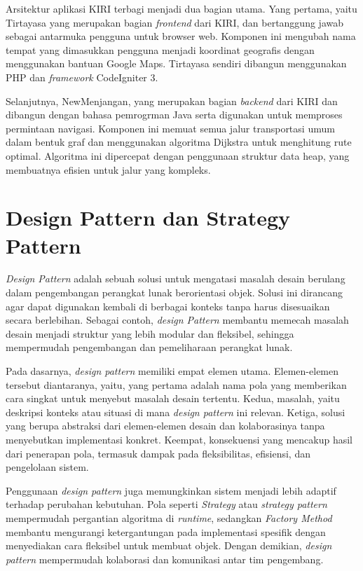 Arsitektur aplikasi KIRI terbagi menjadi dua bagian utama. Yang pertama, yaitu Tirtayasa yang merupakan bagian \textit{frontend} dari KIRI, dan bertanggung jawab sebagai antarmuka pengguna untuk browser web. Komponen ini mengubah nama tempat yang dimasukkan pengguna menjadi koordinat geografis dengan menggunakan bantuan Google Maps. Tirtayasa sendiri dibangun menggunakan PHP dan \textit{framework} CodeIgniter 3.

Selanjutnya, NewMenjangan, yang merupakan bagian \textit{backend} dari KIRI dan dibangun dengan bahasa pemrogrman Java serta digunakan untuk memproses permintaan navigasi. Komponen ini memuat semua jalur transportasi umum dalam bentuk graf dan menggunakan algoritma Dijkstra untuk menghitung rute optimal. Algoritma ini dipercepat dengan penggunaan struktur data heap, yang membuatnya efisien untuk jalur yang kompleks.

\section{Design Pattern dan Strategy Pattern ~\cite{Gamma:94:design}}
\label{sec:designdanstrategypattern}
\textit{Design Pattern} adalah sebuah solusi untuk mengatasi masalah desain berulang dalam pengembangan perangkat lunak berorientasi objek. Solusi ini dirancang agar dapat digunakan kembali di berbagai konteks tanpa harus disesuaikan secara berlebihan. Sebagai contoh, \textit{design Pattern} membantu memecah masalah desain menjadi struktur yang lebih modular dan fleksibel, sehingga mempermudah pengembangan dan pemeliharaan perangkat lunak.

Pada dasarnya, \textit{design pattern} memiliki empat elemen utama. Elemen-elemen tersebut diantaranya, yaitu, yang pertama adalah nama pola yang memberikan cara singkat untuk menyebut masalah desain tertentu. Kedua, masalah, yaitu deskripsi konteks atau situasi di mana \textit{design pattern} ini relevan. Ketiga, solusi yang berupa abstraksi dari elemen-elemen desain dan kolaborasinya tanpa menyebutkan implementasi konkret. Keempat, konsekuensi yang mencakup hasil dari penerapan pola, termasuk dampak pada fleksibilitas, efisiensi, dan pengelolaan sistem.

Penggunaan \textit{design pattern} juga memungkinkan sistem menjadi lebih adaptif terhadap perubahan kebutuhan. Pola seperti \textit{Strategy} atau \textit{strategy pattern} mempermudah pergantian algoritma di \textit{runtime}, sedangkan \textit{Factory Method} membantu mengurangi ketergantungan pada implementasi spesifik dengan menyediakan cara fleksibel untuk membuat objek. Dengan demikian, \textit{design pattern} mempermudah kolaborasi dan komunikasi antar tim pengembang.

